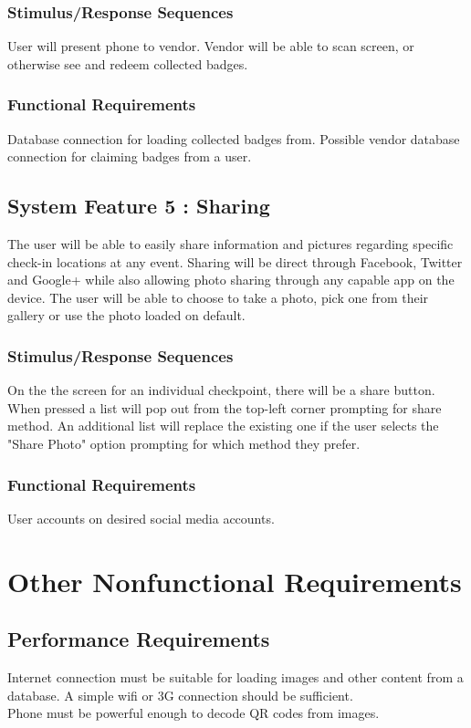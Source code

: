 \documentclass{scrreprt}
\begin{document}
\subsection{Stimulus/Response Sequences}
User will present phone to vendor. Vendor will be able to scan screen, or otherwise
see and redeem collected badges.

\subsection{Functional Requirements}
Database connection for loading collected badges from. Possible vendor database connection
for claiming badges from a user.

\section{System Feature 5 : Sharing}
The user will be able to easily share information and pictures regarding specific check-in locations at any event. Sharing will be  direct through Facebook, Twitter and Google+ while also allowing photo sharing through any capable app on the device. The user will be able to choose to take a photo, pick one from their gallery or use the photo loaded on default. 
\subsection{Stimulus/Response Sequences}
On the the screen for an individual checkpoint, there will be a share button. When pressed a list will pop out from the top-left corner prompting for share method. An additional list will replace the existing one if the user selects the "Share Photo" option prompting for which method they prefer.
\subsection{Functional Requirements}
User accounts on desired social media accounts.

\chapter{Other Nonfunctional Requirements}

\section{Performance Requirements}
Internet connection must be suitable for loading images and other content from a
database. A simple wifi or 3G connection should be sufficient. \\
Phone must be powerful enough to decode QR codes from images.
\end{document}
